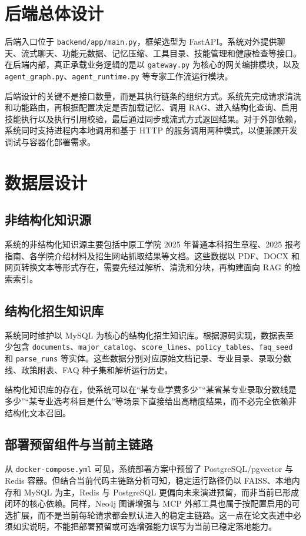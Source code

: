 \documentclass[UTF8,zihao=-4,oneside,fontset=windows]{ctexbook}
\numberwithin{equation}{chapter}
\begin{document}
\section{后端总体设计}
后端入口位于 \texttt{backend/app/main.py}，框架选型为 FastAPI。系统对外提供聊天、流式聊天、功能元数据、记忆压缩、工具目录、技能管理和健康检查等接口\cite{projectanalysis}。在后端内部，真正承载业务逻辑的是以 \texttt{gateway.py} 为核心的网关编排模块，以及 \texttt{agent\_graph.py}、\texttt{agent\_runtime.py} 等专家工作流运行模块。

后端设计的关键不是接口数量，而是其执行链条的组织方式。系统先完成请求清洗和功能路由，再根据配置决定是否加载记忆、调用 RAG、进入结构化查询、启用技能执行以及执行引用校验，最后通过同步或流式方式返回结果。对于外部依赖，系统同时支持进程内本地调用和基于 HTTP 的服务调用两种模式，以便兼顾开发调试与容器化部署需求。

\section{数据层设计}
\subsection{非结构化知识源}
系统的非结构化知识源主要包括中原工学院 2025 年普通本科招生章程、2025 报考指南、各学院介绍材料及招生网站抓取结果等文档\cite{zutpolicy,projectanalysis}。这些数据以 PDF、DOCX 和网页转换文本等形式存在，需要先经过解析、清洗和分块，再构建面向 RAG 的检索索引。

\subsection{结构化招生知识库}
系统同时维护以 MySQL 为核心的结构化招生知识库。根据源码实现，数据表至少包含 \texttt{documents}、\texttt{major\_catalog}、\texttt{score\_lines}、\texttt{policy\_tables}、\texttt{faq\_seed} 和 \texttt{parse\_runs} 等实体\cite{projectanalysis}。这些数据分别对应原始文档记录、专业目录、录取分数线、政策附表、FAQ 种子集和解析运行历史。

结构化知识库的存在，使系统可以在“某专业学费多少”“某省某专业录取分数线是多少”“某专业选考科目是什么”等场景下直接给出高精度结果，而不必完全依赖非结构化文本召回。

\subsection{部署预留组件与当前主链路}
从 \texttt{docker-compose.yml} 可见，系统部署方案中预留了 PostgreSQL/pgvector 与 Redis 容器\cite{projectreadme}。但结合当前代码主链路分析可知，稳定运行路径仍以 FAISS、本地内存和 MySQL 为主，Redis 与 PostgreSQL 更偏向未来演进预留，而非当前已形成闭环的核心依赖\cite{projectanalysis}。同样，Neo4j 图谱增强与 MCP 外部工具也属于按配置启用的可选扩展，而不是当前每轮请求都会默认进入的稳定主链路。这一点在论文表述中必须如实说明，不能把部署预留或可选增强能力误写为当前已稳定落地能力。
\end{document}
